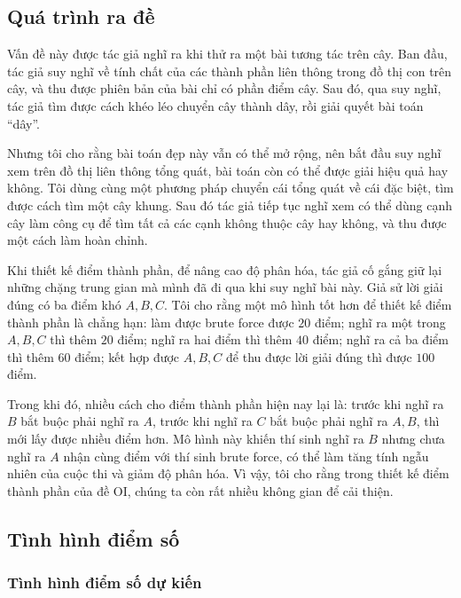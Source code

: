 \documentclass[11pt]{article}
\begin{document}
\subsection{Quá trình ra đề}

Vấn đề này được tác giả nghĩ ra khi thử ra một bài tương tác trên cây. Ban đầu,
tác giả suy nghĩ về tính chất của các thành phần liên thông trong đồ thị con
trên cây, và thu được phiên bản của bài chỉ có phần điểm cây. Sau đó, qua suy
nghĩ, tác giả tìm được cách khéo léo chuyển cây thành dây, rồi giải quyết bài
toán ``dây''.

Nhưng tôi cho rằng bài toán đẹp này vẫn có thể mở rộng, nên bắt đầu suy nghĩ
xem trên đồ thị liên thông tổng quát, bài toán còn có thể được giải hiệu quả
hay không. Tôi dùng cùng một phương pháp chuyển cái tổng quát về cái đặc biệt,
tìm được cách tìm một cây khung. Sau đó tác giả tiếp tục nghĩ xem có thể dùng
cạnh cây làm công cụ để tìm tất cả các cạnh không thuộc cây hay không, và thu
được một cách làm hoàn chỉnh.

Khi thiết kế điểm thành phần, để nâng cao độ phân hóa, tác giả cố gắng giữ lại
những chặng trung gian mà mình đã đi qua khi suy nghĩ bài này. Giả sử lời giải
đúng có ba điểm khó \(A,B,C\). Tôi cho rằng một mô hình tốt hơn để thiết kế
điểm thành phần là chẳng hạn: làm được brute force được \(20\) điểm; nghĩ ra
một trong \(A,B,C\) thì thêm \(20\) điểm; nghĩ ra hai điểm thì thêm \(40\)
điểm; nghĩ ra cả ba điểm thì thêm \(60\) điểm; kết hợp được \(A,B,C\) để thu
được lời giải đúng thì được \(100\) điểm.

Trong khi đó, nhiều cách cho điểm thành phần hiện nay lại là: trước khi nghĩ ra
\(B\) bắt buộc phải nghĩ ra \(A\), trước khi nghĩ ra \(C\) bắt buộc phải nghĩ ra
\(A,B\), thì mới lấy được nhiều điểm hơn. Mô hình này khiến thí sinh nghĩ ra
\(B\) nhưng chưa nghĩ ra \(A\) nhận cùng điểm với thí sinh brute force, có thể
làm tăng tính ngẫu nhiên của cuộc thi và giảm độ phân hóa. Vì vậy, tôi cho rằng
trong thiết kế điểm thành phần của đề OI, chúng ta còn rất nhiều không gian để
cải thiện.

\subsection{Tình hình điểm số}

\subsubsection{Tình hình điểm số dự kiến}
\end{document}
